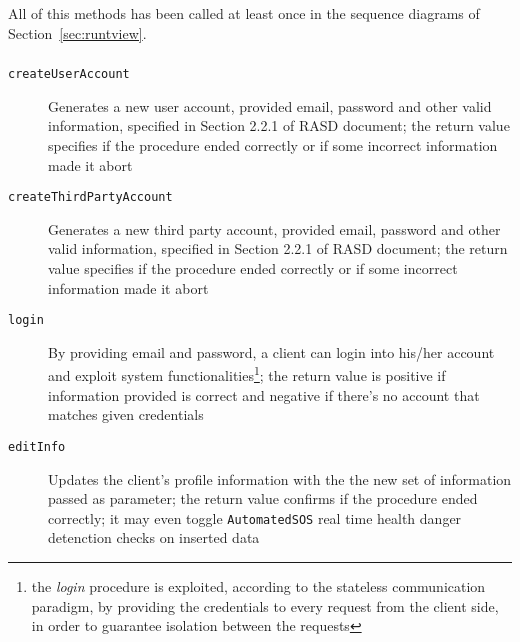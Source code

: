 \documentclass[../DD0.tex]{subfiles}
\begin{document}
    All of this methods has been called at least once in the sequence diagrams of Section~\ref{sec:runtview}.

    \subsubsection{\AccountManager}

      \begin{description}
        \item[\texttt{createUserAccount}] Generates a new user account, provided email, password and other valid information, specified in Section 2.2.1 of RASD document; the return value specifies if the procedure ended correctly or if some incorrect information made it abort

        \item[\texttt{createThirdPartyAccount}] Generates a new third party account, provided email, password and other valid information, specified in Section 2.2.1 of RASD document; the return value specifies if the procedure ended correctly or if some incorrect information made it abort

        \item[\texttt{login}] By providing email and password, a client can login into his/her account and exploit system functionalities\footnote{the \textit{login} procedure is exploited, according to the stateless communication paradigm, by providing the credentials to every request from the client side, in order to guarantee isolation between the requests}; the return value is positive if information provided is correct and negative if there's no account that matches given credentials

        \item[\texttt{editInfo}] Updates the client's profile information with the the new set of information passed as parameter; the return value confirms if the procedure ended correctly; it may even toggle \texttt{AutomatedSOS} real time health danger detenction checks on inserted data

      \end{description}
\end{document}
